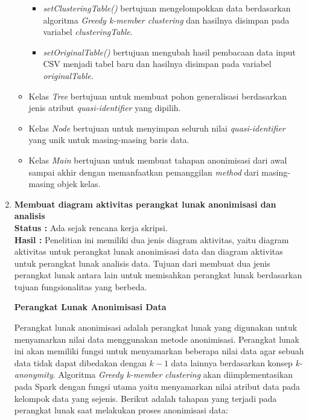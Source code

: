\documentclass[a4paper,twoside]{article}
\begin{document}
\begin{enumerate}
\begin{itemize}
\begin{itemize}
\item \textit{setClusteringTable()} bertujuan mengelompokkan data berdasarkan algoritma \textit{Greedy k-member clustering} dan hasilnya disimpan pada variabel \textit{clusteringTable}.

\item \textit{setOriginalTable()} bertujuan mengubah hasil pembacaan data input CSV menjadi tabel baru dan hasilnya disimpan pada variabel \textit{originalTable}.

\end{itemize}

\item Kelas \textit{Tree} bertujuan untuk membuat pohon generalisasi berdasarkan jenis atribut \textit{quasi-identifier} yang dipilih.

\item Kelas \textit{Node} bertujuan untuk menyimpan seluruh nilai \textit{quasi-identifier} yang unik untuk masing-masing baris data.

\item Kelas \textit{Main} bertujuan untuk membuat tahapan anonimisasi dari awal sampai akhir dengan memanfaatkan pemanggilan \textit{method} dari masing-masing objek kelas.

\end{itemize}
		
		\item \textbf{Membuat diagram aktivitas perangkat lunak anonimisasi dan analisis}\\
		{\bf Status :} Ada sejak rencana kerja skripsi.\\
		{\bf Hasil :} Penelitian ini memiliki dua jenis diagram aktivitas,  yaitu diagram aktivitas untuk perangkat lunak anonimisasi data dan diagram aktivitas untuk perangkat lunak analisis data. Tujuan dari membuat dua jenis perangkat lunak antara lain untuk memisahkan perangkat lunak berdasarkan tujuan fungsionalitas yang berbeda. 

\textbf{Perangkat Lunak Anonimisasi Data}

Perangkat lunak anonimisasi adalah perangkat lunak yang digunakan untuk menyamarkan nilai data menggunakan metode anonimisasi. Perangkat lunak ini akan memiliki fungsi untuk menyamarkan beberapa nilai data agar sebuah data tidak dapat dibedakan dengan $k-1$ data lainnya berdasarkan konsep \textit{k-anonymity}. Algoritma \textit{Greedy k-member clustering} akan diimplementasikan pada Spark dengan fungsi utama yaitu menyamarkan nilai atribut data pada kelompok data yang sejenis. Berikut adalah tahapan yang terjadi pada perangkat lunak saat melakukan proses anonimisasi data:


\end{enumerate}
\end{document}
